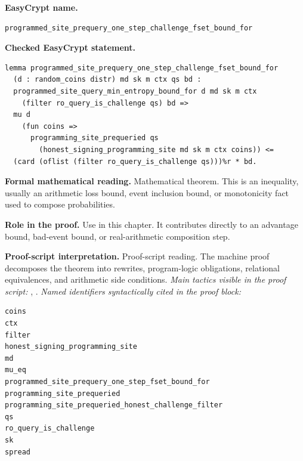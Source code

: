 \begin{formaltheorem}
\noindent\textbf{EasyCrypt name.}
\begin{lstlisting}[language=EasyCrypt,basicstyle=\ttfamily\scriptsize]
programmed_site_prequery_one_step_challenge_fset_bound_for
\end{lstlisting}
\noindent\textbf{Checked EasyCrypt statement.}
\begin{lstlisting}[language=EasyCrypt,basicstyle=\ttfamily\scriptsize]
lemma programmed_site_prequery_one_step_challenge_fset_bound_for
  (d : random_coins distr) md sk m ctx qs bd :
  programmed_site_query_min_entropy_bound_for d md sk m ctx
    (filter ro_query_is_challenge qs) bd =>
  mu d
    (fun coins =>
      programming_site_prequeried qs
        (honest_signing_programming_site md sk m ctx coins)) <=
  (card (oflist (filter ro_query_is_challenge qs)))%r * bd.
\end{lstlisting}
\noindent\textbf{Formal mathematical reading.}
Mathematical theorem. This is an inequality, usually an arithmetic loss bound, event inclusion bound, or monotonicity fact used to compose probabilities.

\noindent\textbf{Role in the proof.}
Use in this chapter. It contributes directly to an advantage bound, bad-event bound, or real-arithmetic composition step.

\noindent\textbf{Proof-script interpretation.}
Proof-script reading. The machine proof decomposes the theorem into rewrites, program-logic obligations, relational equivalences, and arithmetic side conditions.
\emph{Main tactics visible in the proof script:} , .
\emph{Named identifiers syntactically cited in the proof block:}
\begin{lstlisting}[language=EasyCrypt,basicstyle=\ttfamily\scriptsize]
coins
ctx
filter
honest_signing_programming_site
md
mu_eq
programmed_site_prequery_one_step_fset_bound_for
programming_site_prequeried
programming_site_prequeried_honest_challenge_filter
qs
ro_query_is_challenge
sk
spread
\end{lstlisting}

\end{formaltheorem}


